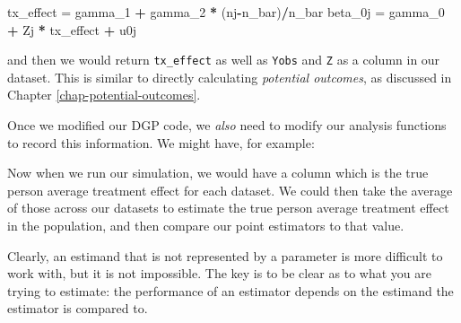 \documentclass[
]{book}
\newenvironment{Shaded}{\begin{snugshade}}{\end{snugshade}}
\newcommand{\AttributeTok}[1]{\textcolor[rgb]{0.13,0.29,0.53}{#1}}
\newcommand{\ControlFlowTok}[1]{\textcolor[rgb]{0.13,0.29,0.53}{\textbf{#1}}}
\newcommand{\FunctionTok}[1]{\textcolor[rgb]{0.13,0.29,0.53}{\textbf{#1}}}
\newcommand{\NormalTok}[1]{#1}
\newcommand{\OtherTok}[1]{\textcolor[rgb]{0.56,0.35,0.01}{#1}}
\newcommand{\SpecialCharTok}[1]{\textcolor[rgb]{0.81,0.36,0.00}{\textbf{#1}}}
\newcommand{\StringTok}[1]{\textcolor[rgb]{0.31,0.60,0.02}{#1}}
\begin{document}
\begin{Shaded}
\begin{Highlighting}[]
\NormalTok{tx\_effect }\OtherTok{=}\NormalTok{ gamma\_1 }\SpecialCharTok{+}\NormalTok{ gamma\_2 }\SpecialCharTok{*}\NormalTok{ (nj}\SpecialCharTok{{-}}\NormalTok{n\_bar)}\SpecialCharTok{/}\NormalTok{n\_bar}
\NormalTok{beta\_0j }\OtherTok{=}\NormalTok{ gamma\_0 }\SpecialCharTok{+}\NormalTok{ Zj }\SpecialCharTok{*}\NormalTok{ tx\_effect }\SpecialCharTok{+}\NormalTok{ u0j}
\end{Highlighting}
\end{Shaded}

and then we would return \texttt{tx\_effect} as well as \texttt{Yobs} and \texttt{Z} as a column in our dataset.
This is similar to directly calculating \emph{potential outcomes}, as discussed in Chapter \ref{chap-potential-outcomes}.

Once we modified our DGP code, we \emph{also} need to modify our analysis functions to record this information.
We might have, for example:

\begin{Shaded}
\end{Shaded}

Now when we run our simulation, we would have a column which is the true person average treatment effect for each dataset.
We could then take the average of those across our datasets to estimate the true person average treatment effect in the population, and then compare our point estimators to that value.

Clearly, an estimand that is not represented by a parameter is more difficult to work with, but it is not impossible.
The key is to be clear as to what you are trying to estimate: the performance of an estimator depends on the estimand the estimator is compared to.
\end{document}
